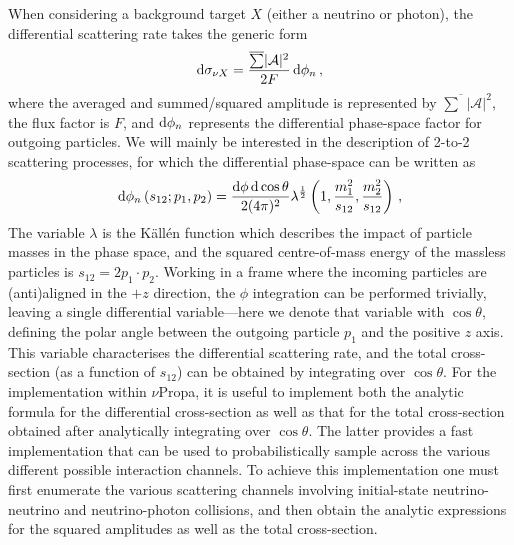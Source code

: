 \documentclass[a4paper,11pt]{article}
\begin{document}
When considering a background target $X$ (either a neutrino or photon), the differential scattering rate takes the generic form 
%
\begin{align} \label{eq:dsigma}
{\rm d} \sigma_{\nu X} = \frac{\overline{\sum} |\mathcal{A}|^2 }{2 F} \, {\rm d}\phi_n\,,
\end{align}
%
where the averaged and summed/squared amplitude is represented by $\overline{\sum} |\mathcal{A}|^2$, the flux factor is $F$, and ${\rm d}\phi_n$ represents the differential phase-space factor for outgoing particles.
%
We will mainly be interested in the description of 2-to-2 scattering processes, for which the differential phase-space can be written as
%
\begin{align}
 {\rm d}\phi_n\left( s_{12};p_1,p_2 \right) = \frac{{\rm d} \phi \, {\rm d}\cos \theta}{2(4\pi)^2}\lambda^{\frac{1}{2}}\left(1,\frac{m_1^2}{s_{12}},\frac{m_2^2}{s_{12}}\right) \,,
\end{align}
%
The variable $\lambda$ is the K\"all\'en function which describes the impact of particle masses in the phase space, and the squared centre-of-mass energy of the massless particles is $s_{12} = 2 p_1 \cdot p_2$.
%
Working in a frame where the incoming particles are (anti)aligned in the $+z$ direction, the $\phi$ integration can be performed trivially, leaving a single differential variable---here we denote that variable with $\cos \theta$, defining the polar angle between the outgoing particle $p_1$ and the positive $z$ axis.
This variable characterises the differential scattering rate, and the total cross-section (as a function of $s_{12}$) can be obtained by integrating over $\cos \theta$.
%
For the implementation within $\nu$Propa, it is useful to implement both the analytic formula for the differential cross-section as well as that for the total cross-section obtained after analytically integrating over $\cos \theta$.
The latter provides a fast implementation that can be used to probabilistically sample across the various different possible interaction channels.
%
To achieve this implementation one must first enumerate the various scattering channels involving initial-state neutrino-neutrino and neutrino-photon collisions, and then obtain the analytic expressions for the squared amplitudes as well as the total cross-section.
\end{document}
